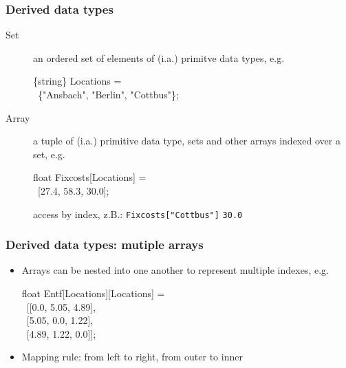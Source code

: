\begin{frame}
 \frametitle{Derived data types}
 \begin{description}
  \item[Set] an ordered set of elements of (i.a.) primitve data types, e.g.
  \begin{flushleft}\ttfamily{}
  \{string\} Locations =\\\ \{"Ansbach", "Berlin", "Cottbus"\};
  \end{flushleft}
  \item[Array] a tuple of (i.a.) primitive data type, sets and other arrays indexed over a set, e.g.
  \begin{flushleft}\ttfamily{}
  float Fixcosts[Locations] =\\\ [27.4, 58.3, 30.0];
  \end{flushleft}
  access by index, z.B.: \texttt{Fixcosts["Cottbus"]} \textrightarrow{} \texttt{30.0}
 \end{description}
\end{frame}

\begin{frame}
 \frametitle{Derived data types: mutiple arrays}
 \begin{itemize}
  \item Arrays can be nested into one another to represent multiple indexes, e.g.
    \begin{flushleft}\ttfamily{}
      float Entf[Locations][Locations] =\\ 
      \ [[0.0, 5.05, 4.89],\\
      \ [5.05, 0.0, 1.22],\\
      \ [4.89, 1.22, 0.0]];
    \end{flushleft}
  \item Mapping rule: from left to right, from outer to inner
 \end{itemize}
\end{frame}

